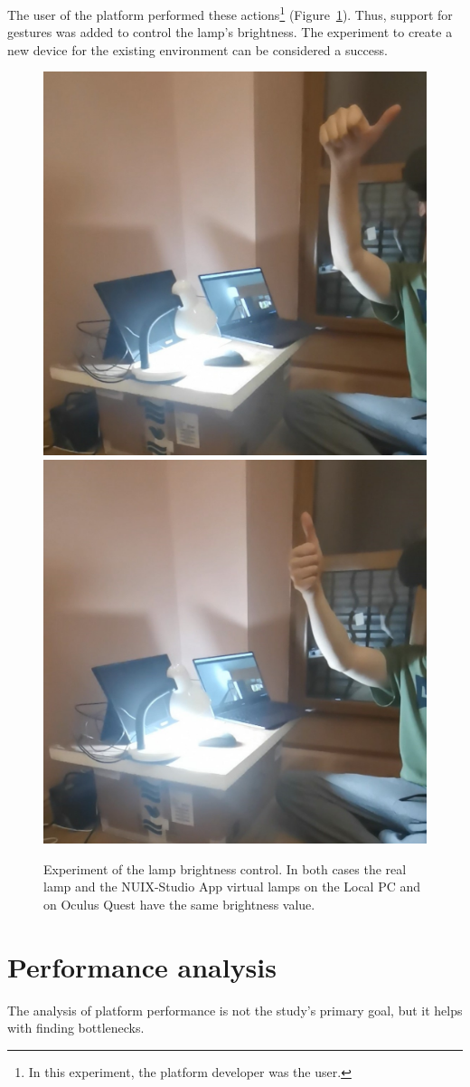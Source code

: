 The user of the platform performed these actions\footnote{In this experiment, the platform developer was the user.} (Figure~\ref{fig:BrightnessControl-figure}). Thus, support for gestures was added to control the lamp's brightness. The experiment to create a new device for the existing environment can be considered a success.

\begin{figure}
  \centering
    {\includegraphics[width=0.45\linewidth]{figures/HalflBrightness.jpg}}
    {\includegraphics[width=0.45\linewidth]{figures/FullBrightness.jpg}}
  \caption{Experiment of the lamp brightness control. In both cases the real lamp and the NUIX-Studio App virtual lamps on the Local PC and on Oculus Quest have the same brightness value.}
  \label{fig:BrightnessControl-figure}
\end{figure}

\section{Performance analysis}

The analysis of platform performance is not the study's primary goal, but it helps with finding bottlenecks. 

